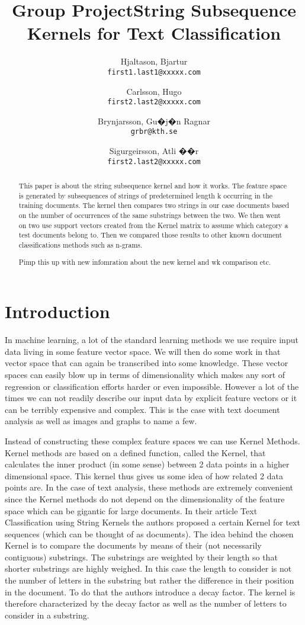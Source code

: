 \documentclass{article}
\title{Group Project}
\author{
  Hjaltason, Bjartur\\
  \texttt{first1.last1@xxxxx.com}
  \and
  Carlsson, Hugo\\
  \texttt{first2.last2@xxxxx.com}
  \and
  Brynjarsson, Gu�j�n Ragnar\\
  \texttt{grbr@kth.se}
    \and
  Sigurgeirsson, Atli ��r\\
  \texttt{first2.last2@xxxxx.com}
}
\date{}
\title{String Subsequence Kernels for Text Classification}
\theoremstyle{definition}
\begin{document}
\begin{otherlanguage}{icelandic}
\maketitle
\end{otherlanguage}
\begin{abstract}
    This paper is about the string subsequence kernel and how it works. The feature space is generated by subsequences of strings of predetermined length k occurring in the training documents. The kernel then compares two strings in our case documents based on the number of occurrences of the same substrings between the two. We then went on two use support vectors created from the Kernel matrix to assume which category a test documents belong to. Then we compared those results to other known document classifications methods such as n-grams.
    
    Pimp this up with new infomration about the new kernel and wk comparison etc.
\end{abstract}



\section{Introduction}

In machine learning, a lot of the standard learning methods we use require input data living  in some feature vector space. We will then do some work in that vector space that can again  be transcribed into some knowledge. These vector spaces can easily blow up in terms of  dimensionality which makes any sort of regression or classification efforts harder or even  impossible. However a lot of the times we can not readily describe our input data by explicit  feature vectors or it can be terribly expensive and complex. This is the case with text  document analysis as well as images and graphs to name a few.

Instead of constructing these complex feature spaces we can use Kernel Methods. Kernel methods are based on a defined function, called the Kernel, that calculates the inner product (in some sense) between 2 data points in a higher dimensional space. This kernel thus gives us some idea of how related 2 data points are. In the case of text analysis, these methods are extremely convenient since the Kernel methods do not depend on the dimensionality of the feature space which can be gigantic for large documents. In their article Text Classification using String Kernels the authors proposed a certain Kernel for text sequences (which can be thought of as documents).  The idea behind the chosen  Kernel is to compare the documents by means of their (not necessarily contiguous) substrings. The substrings are weighted by their length so that shorter substrings are highly weighed. In this case the length to consider is not the number of letters in the substring but rather the  difference in their position in the document. To do that the authors introduce a decay factor. The kernel is therefore characterized by the decay factor as well as the number of  letters to consider in a substring.
\end{document}
